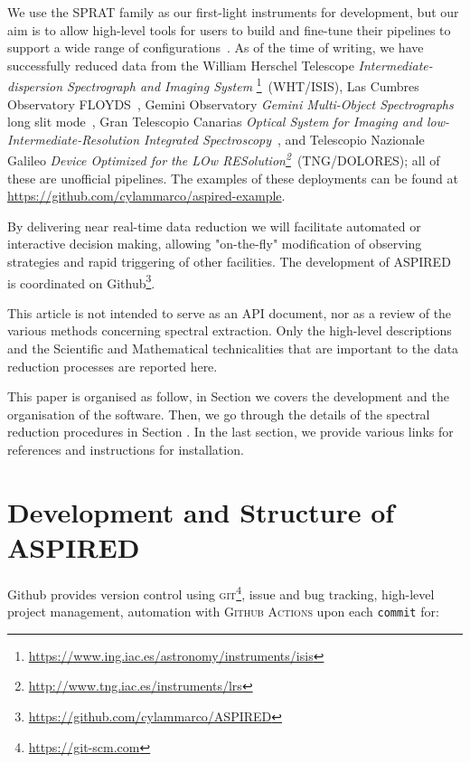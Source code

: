 \documentclass[fleqn,usenatbib]{mnras}
\begin{document}
We use the SPRAT family as our first-light instruments for development, but our aim is to
allow high-level tools for users to build and fine-tune their pipelines to support
a wide range of configurations~\citep{2020arXiv201203505L, marco_2021_4463569}. As of the time of
writing, we have successfully reduced data from the William Herschel Telescope
\textit{Intermediate-dispersion Spectrograph and Imaging System}
\footnote{\url{https://www.ing.iac.es/astronomy/instruments/isis}}~(WHT/ISIS), Las Cumbres
Observatory FLOYDS~\citep[LCO/FLOYDS]{2013PASP..125.1031B}, Gemini Observatory
\textit{Gemini Multi-Object Spectrographs} long slit
mode~\citep[Gemini/GMOS-LS]{2004PASP..116..425H}, Gran Telescopio Canarias \textit{Optical
System for Imaging and low-Intermediate-Resolution Integrated
Spectroscopy}~\citep[GTC/OSIRIS]{2000SPIE.4008..623C}, and Telescopio Nazionale Galileo
\textit{Device Optimized for the LOw
RESolution\footnote{\url{http://www.tng.iac.es/instruments/lrs}}}~(TNG/DOLORES); all of
these are unofficial pipelines. The examples of these deployments can be found at
\url{https://github.com/cylammarco/aspired-example}.

By delivering near real-time data reduction we will facilitate automated or interactive
decision making, allowing "on-the-fly" modification of observing strategies and rapid
triggering of other facilities. The development of ASPIRED is coordinated on Github\footnote{\url{https://github.com/cylammarco/ASPIRED}}.

This article is not intended to serve as an API document, nor as a review of the
various methods concerning spectral extraction. Only the high-level
descriptions and the Scientific and Mathematical technicalities that are
important to the data reduction processes are reported here.

This paper is organised as follow, in Section  we covers the development and
the organisation of the software. Then, we go through the details of the spectral reduction
procedures in Section . In the last section, we provide various links
for references and instructions for installation.

\section{Development and Structure of ASPIRED}
Github provides version control using \textsc{git}\footnote{\url{https://git-scm.com}}, issue and bug tracking, high-level project management, automation with \textsc{Github Actions} upon each \texttt{commit} for:
\end{document}
